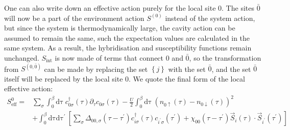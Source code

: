 \documentclass[reprint,hidelinks]{revtex4-2}
\begin{document}
\begin{widetext}
One can also write down an effective action purely for the local site \(0\). The sites \(\bar 0\) will now be a part of the environment action \(S^{(0)}\) instead of the system action, but since the system is thermodynamically large, the cavity action can be assumed to remain the same, such the expectation values are calculated in the same system. As a result, the hybridisation and susceptibility functions remain unchanged. \(S_\text{int}\) is now made of terms that connect \(0\) and \(\bar 0\), so the transformation from \(S^{(0,\bar 0)}\) can be made by replacing the set \(\left\{ j \right\} \) with the set \(\bar 0\), and the set \(\bar 0\) itself will be replaced by the local site \(0\). We quote the final form of the local effective action:
\begin{equation}\begin{aligned}
	S^{0}_\text{eff} =& \sum_\sigma \int_0^\beta\mathrm{d\tau}~c^\dagger_{0\sigma}(\tau)\partial_\tau c_{0\sigma}(\tau) - \frac{U}{2}\int_0^\beta\mathrm{d\tau}~\left(n_{0\uparrow}(\tau) - n_{0\downarrow}(\tau)\right)^2 \\
			  &+ \int_0^\beta\mathrm{d\tau}\mathrm{d\tau^\prime}~\left[\sum_{\sigma}\Delta_{00,\sigma}(\tau - \tau^\prime)c^\dagger_{i\sigma}(\tau)c_{i^\prime\sigma}(\tau^\prime) + \chi_{00}(\tau - \tau^\prime)\vec{S}_{i}(\tau)\cdot\vec{S}_{i^\prime}(\tau^\prime)\right]
\end{aligned}\end{equation}


\end{widetext}
\end{document}
